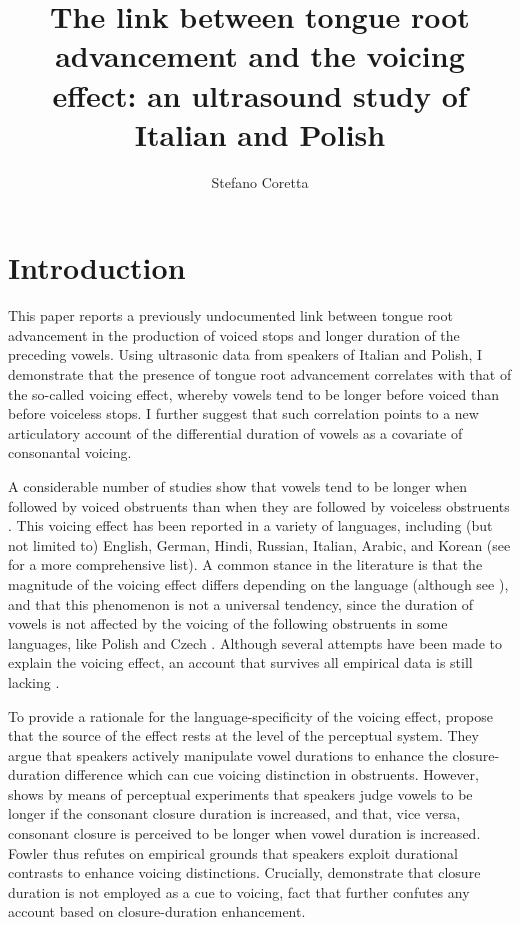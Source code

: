 \documentclass[authoryear, twocolumn]{elsarticle}
\author[mcr]{Stefano Coretta\corref{cor1}}
\title{The link between tongue root advancement and the voicing effect: an
ultrasound study of Italian and Polish}
\date{}
\begin{document}
\maketitle

\section{Introduction}\label{introduction}

This paper reports a previously undocumented link between tongue root
advancement in the production of voiced stops and longer duration of the
preceding vowels. Using ultrasonic data from speakers of Italian and
Polish, I demonstrate that the presence of tongue root advancement
correlates with that of the so-called voicing effect, whereby vowels
tend to be longer before voiced than before voiceless stops. I further
suggest that such correlation points to a new articulatory account of
the differential duration of vowels as a covariate of consonantal
voicing.

A considerable number of studies show that vowels tend to be longer when
followed by voiced obstruents than when they are followed by voiceless
obstruents
\citep{house1953, chen1970, klatt1973, lisker1974, farnetani1986, fowler1992, hussein1994, esposito2002, lampp2004, durvasula2012}.
This voicing effect has been reported in a variety of languages,
including (but not limited to) English, German, Hindi, Russian, Italian,
Arabic, and Korean (see \citealt{maddieson1976} for a more comprehensive
list). A common stance in the literature is that the magnitude of the
voicing effect differs depending on the language (although see
\citealt{laeufer1992}), and that this phenomenon is not a universal
tendency, since the duration of vowels is not affected by the voicing of
the following obstruents in some languages, like Polish and Czech
\citep{keating1984}. Although several attempts have been made to explain
the voicing effect, an account that survives all empirical data is still
lacking \citep{durvasula2012}.

To provide a rationale for the language-specificity of the voicing
effect, \citet{kluender1988} propose that the source of the effect rests
at the level of the perceptual system. They argue that speakers actively
manipulate vowel durations to enhance the closure-duration difference
which can cue voicing distinction in obstruents. However,
\citet{fowler1992} shows by means of perceptual experiments that
speakers judge vowels to be longer if the consonant closure duration is
increased, and that, vice versa, consonant closure is perceived to be
longer when vowel duration is increased. Fowler thus refutes on
empirical grounds that speakers exploit durational contrasts to enhance
voicing distinctions. Crucially, \citet{davis1989} demonstrate that
closure duration is not employed as a cue to voicing, fact that further
confutes any account based on closure-duration enhancement.
\end{document}
